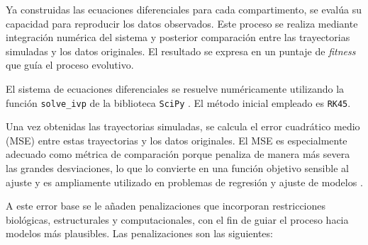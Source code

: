 Ya construidas las ecuaciones diferenciales para cada compartimento, se evalúa su capacidad para reproducir los datos observados. Este proceso se realiza mediante 
integración numérica del sistema y posterior comparación entre las trayectorias simuladas y los datos originales. El resultado se expresa en un puntaje de 
\textit{fitness} que guía el proceso evolutivo.

El sistema de ecuaciones diferenciales se resuelve numéricamente utilizando la función \texttt{solve\_ivp} de la biblioteca \texttt{SciPy} \cite{Virtanen2020SciPy}. El método inicial empleado es 
\texttt{RK45}.

Una vez obtenidas las trayectorias simuladas, se calcula el error cuadrático medio (MSE) entre estas trayectorias y los datos originales. El MSE es especialmente 
adecuado como métrica de comparación porque penaliza de manera más severa las grandes desviaciones, lo que lo convierte en una función objetivo sensible al ajuste
y es ampliamente utilizado en problemas de regresión y ajuste de modelos \cite{Hastie2009, Bishop2006}.

A este error base se le añaden penalizaciones que incorporan restricciones biológicas, estructurales y computacionales, con el fin de guiar el proceso hacia modelos 
más plausibles. Las penalizaciones son las siguientes:

